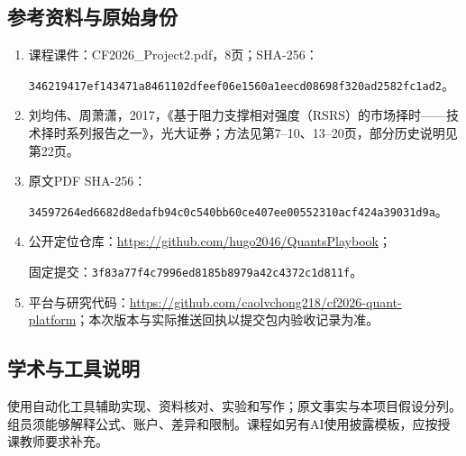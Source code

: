 \documentclass[UTF8,a4paper,10pt]{ctexart}
\begin{document}
\subsection*{参考资料与原始身份}
\begin{enumerate}
\item 课程课件：CF2026\_Project2.pdf，8页；SHA-256：\par{\scriptsize\texttt{346219417ef143471a8461102dfeef06e1560a1eecd08698f320ad2582fc1ad2}}。
\item 刘均伟、周萧潇，2017，《基于阻力支撑相对强度（RSRS）的市场择时——技术择时系列报告之一》，光大证券；方法见第7--10、13--20页，部分历史说明见第22页。
\item 原文PDF SHA-256：\par{\scriptsize\texttt{34597264ed6682d8edafb94c0c540bb60ce407ee00552310acf424a39031d9a}}。
\item 公开定位仓库：\url{https://github.com/hugo2046/QuantsPlaybook}；\par 固定提交：{\scriptsize\texttt{3f83a77f4c7996ed8185b8979a42c4372c1d811f}}。
\item 平台与研究代码：\url{https://github.com/caolvchong218/cf2026-quant-platform}；本次版本与实际推送回执以提交包内验收记录为准。
\end{enumerate}
\subsection*{学术与工具说明}
使用自动化工具辅助实现、资料核对、实验和写作；原文事实与本项目假设分列。组员须能够解释公式、账户、差异和限制。课程如另有AI使用披露模板，应按授课教师要求补充。
\end{document}
